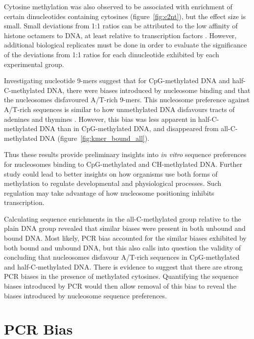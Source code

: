 \documentclass[parskip=full, numbers=noenddot]{scrbook}
\begin{document}
Cytosine methylation was also observed to be associated with enrichment of certain dinucleotides containing cytosines (figure~\ref{fig:c2nt}), but the effect size is small.  Small deviations from 1:1 ratios can be attributed to the low affinity of histone octamers to DNA, at least relative to transcription factors \citep{struhl_determinants_2013}. %
However, additional biological replicates must be done in order to evaluate the significance of the deviations from 1:1 ratios for each dinucleotide exhibited by each experimental group.

Investigating nucleotide 9-mers suggest that for CpG-methylated DNA and half-C-methylated DNA, there were biases introduced by nucleosome binding and that the nucleosomes disfavoured A/T-rich 9-mers.  This nucleosome preference against A/T-rich sequences is similar to how unmethylated DNA disfavours tracts of adenines and thymines \citep{struhl_determinants_2013}. However, this bias was less apparent in half-C-methylated DNA than in CpG-methylated DNA, and disappeared from all-C-methylated DNA (figure~\ref{fig:kmer_bound_all}).

Thus these results provide preliminary insights into \emph{in vitro} sequence preferences for nucleosomes binding to CpG-methylated and CH-methylated DNA.  Further study could lead to better insights on how organisms use both forms of methylation to regulate developmental and physiological processes.  Such regulation may take advantage of how nucleosome positioning inhibits transcription.

Calculating sequence enrichments in the all-C-methylated group relative to the plain DNA group revealed that similar biases were present in both unbound and bound DNA.  Most likely, PCR bias accounted for the similar biases exhibited by both bound and unbound DNA, but this also calls into question the validity of concluding that nucleosomes disfavour A/T-rich sequences in CpG-methylated and half-C-methylated DNA.  There is evidence to suggest that there are strong PCR biases in the presence of methylated cytosines.  Quantifying the sequence biases introduced by PCR would then allow removal of this bias to reveal the biases introduced by nucleosome sequence preferences.

\chapter{PCR Bias}
\label{ch:pcrbias}
\end{document}
